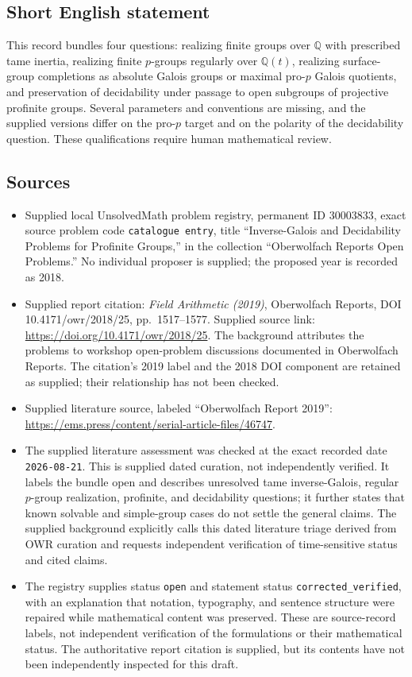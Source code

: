 \documentclass[11pt]{article}
\newcommand{\Q}{\mathbb{Q}}
\begin{document}
\subsection{Short English statement}
This record bundles four questions: realizing finite groups over \(\Q\) with prescribed tame inertia, realizing finite \(p\)-groups regularly over \(\Q(t)\), realizing surface-group completions as absolute Galois groups or maximal pro-\(p\) Galois quotients, and preservation of decidability under passage to open subgroups of projective profinite groups. Several parameters and conventions are missing, and the supplied versions differ on the pro-\(p\) target and on the polarity of the decidability question. These qualifications require human mathematical review.
\subsection{Sources}
\begin{itemize}
\item Supplied local UnsolvedMath problem registry, permanent ID \(30003833\), exact source problem code \texttt{catalogue entry}, title ``Inverse-Galois and Decidability Problems for Profinite Groups,'' in the collection ``Oberwolfach Reports Open Problems.'' No individual proposer is supplied; the proposed year is recorded as 2018.
\item Supplied report citation: \emph{Field Arithmetic (2019)}, Oberwolfach Reports, DOI 10.4171/owr/2018/25, pp.~1517--1577. Supplied source link: \url{https://doi.org/10.4171/owr/2018/25}. The background attributes the problems to workshop open-problem discussions documented in Oberwolfach Reports. The citation's 2019 label and the 2018 DOI component are retained as supplied; their relationship has not been checked.
\item Supplied literature source, labeled ``Oberwolfach Report 2019'': \url{https://ems.press/content/serial-article-files/46747}.
\item The supplied literature assessment was checked at the exact recorded date \texttt{2026-08-21}. This is supplied dated curation, not independently verified. It labels the bundle open and describes unresolved tame inverse-Galois, regular \(p\)-group realization, profinite, and decidability questions; it further states that known solvable and simple-group cases do not settle the general claims. The supplied background explicitly calls this dated literature triage derived from OWR curation and requests independent verification of time-sensitive status and cited claims.
\item The registry supplies status \texttt{open} and statement status \texttt{corrected\_verified}, with an explanation that notation, typography, and sentence structure were repaired while mathematical content was preserved. These are source-record labels, not independent verification of the formulations or their mathematical status. The authoritative report citation is supplied, but its contents have not been independently inspected for this draft.
\end{itemize}
\end{document}
